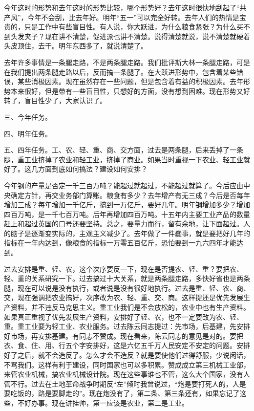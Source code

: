 今年这时的形势和去年这时的形势比较，哪个形势好？去年这时很快地刮起了“共产风”，今年不会刮，比去年好。明年“五一”可以完全好转。去年人们的热情是宝贵的，只是工作中有些盲目性。有人说，你大跃进，为什么粮食紧张？为什么买不到头发夹子？现在讲不清楚，促进派也讲不清楚。说得清楚就说，说不清楚就硬着头皮顶住，去干。明年东西多了，就说清楚了。

去年许多事情是一条腿走路，不是两条腿走路。我们批评斯大林一条腿走路，可是在我们提出两条腿走路以后，反而搞一条腿了。在大跃进形势中，包含着某些错误，某些消极因素。现在虽然存在一些问题，但是包含着有益的积极因素。去年形势本来很好，但是带有一些盲目性，只想好的方面，没有想到困难。现在形势又好转了，盲目性少了，大家认识了。

三、今年任务。

四、明年任务。

五、四年任务。工、农、轻、重、商、交方面，过去是两条腿，后来丢掉了一条腿，重工业挤掉了农业和轻工业，挤掉了商业。如果当时重视一下农业、轻工业就好了。这几方面到底如何搞法？建设如何安排？

今年钢的产量是否定一千三百万吨？能超过就超过，不能超过就算了。今后应由中央确定方针，再交业务部门算账。粮食有多少？去年增产有无三成？今后是否每年增加三成？每年增加一千亿斤，搞到一万亿斤，要好几年。明年钢增加多少？增加四百万吨，是一千七百万吨。后年再增加四百万吨。十五年内主要工业产品的数量赶上和超过英国的口号还要坚持。总之，要量力而行，留有余地，让下面超过。人的脑子是逐渐变实际的，主观主义减少了。去年做了一件蠢事，就是要把好几年的指标在一年内达到，像粮食的指标一万零五百亿斤，恐怕要到一九六四年才能达到。

过去安排是重、轻、农，这个次序要反一下，现在是否提农、轻、重？要把农、轻、重的关系研究一下。过去搞过十大关系，就是两条腿走路，多快好省也是两条腿，现在可以说是没有执行，或者说是没有很好地执行。过去是重、轻、农、商、交，现在强调把农业搞好，次序改为农、轻、重、交、商。这样提还是优先发展生产资料，并不违反马克思主义。重工业我们是不会放松的，农业中也有生产资料。如果真正重视了优先发展生产资料，安排好了轻、农，也不一定要改为农、轻、重。重工业要为轻工业、农业服务。过去陈云同志提过：先市场，后基建，先安排好市场，再安排基建。有同志不赞成。现在看来，陈云同志的意见是对的。要把衣、食、住、用、行五个字安排好，这是六亿五千万人民安定不安定的问题。安排好了之后，就不会造反了。怎么才会不造反？就是要使他们过得舒服，少说闲话，不骂我们。这样有利于建设，同时国家也可以多积累。赞成成立第三机械工业部，来管农业机械，搞农业机械设计院。现在这些事谁也不管，这么大个国家，没有人管不行。过去在土地革命战争时期反“左”倾时我曾说过，“炮是要打死人的，人是要吃饭的，路是要脚走的”。现在炮没有了，第二条、第三条还有，如果忘记了这些，不好办事。现在讲挂帅，第一应该是农业，第二是工业。

